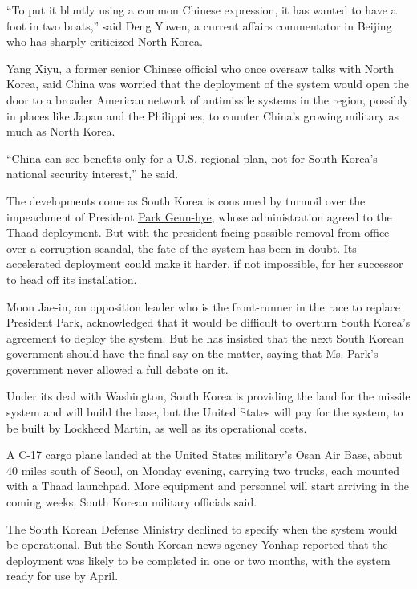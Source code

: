 ``To put it bluntly using a common Chinese expression, it has wanted to
have a foot in two boats,'' said Deng Yuwen, a current affairs
commentator in Beijing who has sharply criticized North Korea.

Yang Xiyu, a former senior Chinese official who once oversaw talks with
North Korea, said China was worried that the deployment of the system
would open the door to a broader American network of antimissile systems
in the region, possibly in places like Japan and the Philippines, to
counter China's growing military as much as North Korea.

``China can see benefits only for a U.S. regional plan, not for South
Korea's national security interest,'' he said.

The developments come as South Korea is consumed by turmoil over the
impeachment of President
\href{http://topics.nytimes3xbfgragh.onion/top/reference/timestopics/people/p/park_geunhye/index.html?inline=nyt-per}{Park
Geun-hye}, whose administration agreed to the Thaad deployment. But with
the president facing
\href{https://www.nytimes3xbfgragh.onion/2016/12/09/world/asia/south-korea-president-park-geun-hye-impeached.html}{possible
removal from office} over a corruption scandal, the fate of the system
has been in doubt. Its accelerated deployment could make it harder, if
not impossible, for her successor to head off its installation.

Moon Jae-in, an opposition leader who is the front-runner in the race to
replace President Park, acknowledged that it would be difficult to
overturn South Korea's agreement to deploy the system. But he has
insisted that the next South Korean government should have the final say
on the matter, saying that Ms. Park's government never allowed a full
debate on it.

Under its deal with Washington, South Korea is providing the land for
the missile system and will build the base, but the United States will
pay for the system, to be built by Lockheed Martin, as well as its
operational costs.

A C-17 cargo plane landed at the United States military's Osan Air Base,
about 40 miles south of Seoul, on Monday evening, carrying two trucks,
each mounted with a Thaad launchpad. More equipment and personnel will
start arriving in the coming weeks, South Korean military officials
said.

The South Korean Defense Ministry declined to specify when the system
would be operational. But the South Korean news agency Yonhap reported
that the deployment was likely to be completed in one or two months,
with the system ready for use by April.

